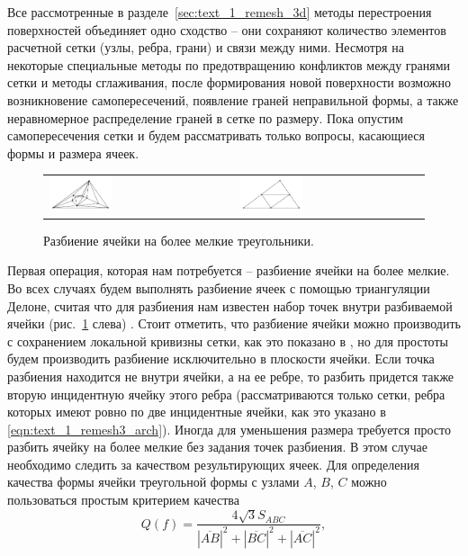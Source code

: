 Все рассмотренные в разделе~\ref{sec:text_1_remesh_3d} методы перестроения поверхностей объединяет одно сходство -- они сохраняют количество элементов расчетной сетки (узлы, ребра, грани) и связи между ними.
Несмотря на некоторые специальные методы по предотвращению конфликтов между гранями сетки и методы сглаживания, после формирования новой поверхности возможно возникновение самопересечений, появление граней неправильной формы, а также неравномерное распределение граней в сетке по размеру.
Пока опустим самопересечения сетки и будем рассматривать только вопросы, касающиеся формы и размера ячеек.

\begin{figure}[ht]
\centering
\begin{tabular}{ll}
\includegraphics[width=0.35\textwidth]{./pics/text_1_int/pic_delaunay.pdf}
&
\includegraphics[width=0.35\textwidth]{./pics/text_1_int/pic_delaunay_2.pdf}
\end{tabular}
\singlespacing
{}\caption{Разбиение ячейки на более мелкие треугольники.}
\label{fig:text_1_int_cut}
\end{figure}

Первая операция, которая нам потребуется -- разбиение ячейки на более мелкие.
Во всех случаях будем выполнять разбиение ячеек с помощью триангуляции Делоне, считая что для разбиения нам известен набор точек внутри разбиваемой ячейки (рис.~\ref{fig:text_1_int_cut} слева) \cite{Rivara2019Delaunay}.
Стоит отметить, что разбиение ячейки можно производить с сохранением локальной кривизны сетки, как это показано в \cite{Rakotoarivelo2019Remesh}, но для простоты будем производить разбиение исключительно в плоскости ячейки.
Если точка разбиения находится не внутри ячейки, а на ее ребре, то разбить придется также вторую инцидентную ячейку этого ребра (рассматриваются только сетки, ребра которых имеют ровно по две инцидентные ячейки, как это указано в \eqref{eqn:text_1_remesh3_arch}).
Иногда для уменьшения размера требуется просто разбить ячейку на более мелкие без задания точек разбиения.
В этом случае необходимо следить за качеством результирующих ячеек.
Для определения качества формы ячейки треугольной формы с узлами $A$, $B$, $C$ можно пользоваться простым критерием качества
\begin{equation}
Q(f) = \frac{4\sqrt{3} S_{ABC}}{|\overline{AB}|^2 + |\overline{BC}|^2 + |\overline{AC}|^2},
\end{equation}

